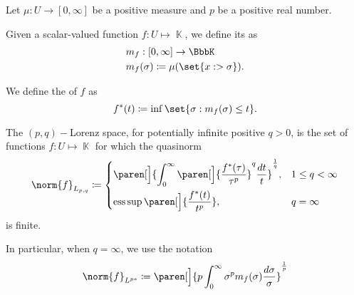 \begin{definition}\label{def:distribution_function}\cite[6]{Bergh1976}
  Let \( \mu: U \to [0, \infty] \) be a positive measure and \( p \) be a positive real number.

  \begin{defenum}
     Given a scalar-valued function \( f: U \mapsto \BbbK \), we define its  as
    \begin{align*}
      &m_f: [0, \infty] \to \BbbK \\
      &m_f(\sigma) \coloneqq \mu(\set{ x :  > \sigma }).
    \end{align*}

     We define the  of \( f \) as
    \begin{equation*}
      f^*(t) \coloneqq \inf\set{ \sigma : m_f(\sigma) \leq t }.
    \end{equation*}

     The \( (p, q)-\)Lorenz space, for potentially infinite positive \( q > 0 \), is the set of functions \( f: U \mapsto \BbbK \) for which the quasinorm
    \begin{equation*}
      \norm{f}_{L_{p,q}} \coloneqq \begin{dcases}
        \paren[\Big]{\int_0^\infty \paren[\Big]{\frac {f^*(\tau)} {\tau^p}}^q \frac {d t} t}^{\frac 1 q}, &1 \leq q < \infty \\
        \ess\sup\paren[\Big]{\frac {f^*(t)} {t^p}}, &q = \infty
      \end{dcases}
    \end{equation*}
    is finite.

    In particular, when \( q = \infty \), we use the notation
    \begin{equation*}
      \norm{f}_{L^{p*}} \coloneqq \paren[\Big]{p \int_0^\infty \sigma^p m_f(\sigma) \frac {d \sigma} \sigma}^{\frac 1 p}
    \end{equation*}
  \end{defenum}
\end{definition}

